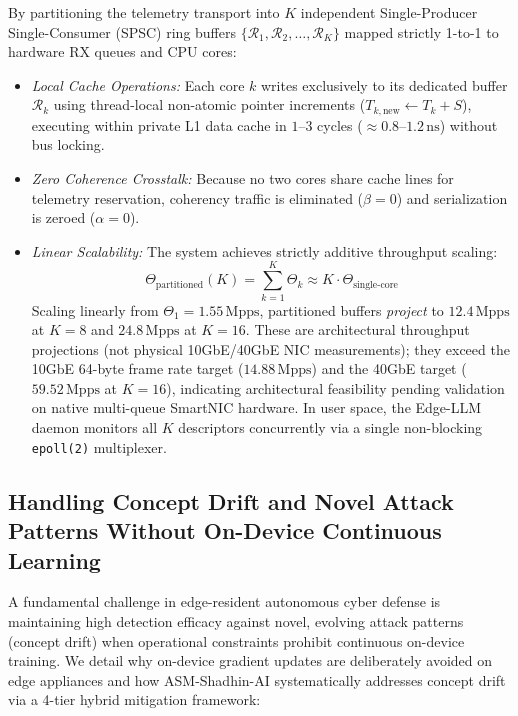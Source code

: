 \documentclass{ieeeaccess}
\renewcommand{\_}{\textunderscore\allowbreak}
\begin{document}
\begin{enumerate}
  By partitioning the telemetry transport into $K$ independent Single-Producer Single-Consumer (SPSC) ring buffers $\{\mathcal{R}_1, \mathcal{R}_2, \dots, \mathcal{R}_K\}$ mapped strictly 1-to-1 to hardware RX queues and CPU cores:
  \begin{itemize}
    \item \textit{Local Cache Operations:} Each core $k$ writes exclusively to its dedicated buffer $\mathcal{R}_k$ using thread-local non-atomic pointer increments ($T_{k,\text{new}} \leftarrow T_k + S$), executing within private L1 data cache in $1$--$3$ cycles (${\approx}0.8$--$1.2\,\text{ns}$) without bus locking.
    \item \textit{Zero Coherence Crosstalk:} Because no two cores share cache lines for telemetry reservation, coherency traffic is eliminated ($\beta = 0$) and serialization is zeroed ($\alpha = 0$).
    \item \textit{Linear Scalability:} The system achieves strictly additive throughput scaling:
    \begin{equation}
      \Theta_{\text{partitioned}}(K) = \sum_{k=1}^K \Theta_k \approx K \cdot \Theta_{\text{single-core}}
      \label{eq:partitioned_scaling}
    \end{equation}
    Scaling linearly from $\Theta_1 = 1.55\,\text{Mpps}$, partitioned buffers \textit{project} to
    $12.4\,\text{Mpps}$ at $K=8$ and $24.8\,\text{Mpps}$ at $K=16$. These are architectural
    throughput projections (not physical 10GbE/40GbE NIC measurements); they exceed the
    10GbE 64-byte frame rate target ($14.88\,\text{Mpps}$) and the 40GbE target
    ($59.52\,\text{Mpps}$ at $K=16$), indicating architectural feasibility pending
    validation on native multi-queue SmartNIC hardware.
    In user space, the Edge-LLM daemon monitors all $K$ descriptors concurrently via a
    single non-blocking \texttt{epoll(2)} multiplexer.
  \end{itemize}
\end{enumerate}

\subsection{Handling Concept Drift and Novel Attack Patterns Without On-Device Continuous Learning}
A fundamental challenge in edge-resident autonomous cyber defense is maintaining high detection efficacy against novel, evolving attack patterns (concept drift) when operational constraints prohibit continuous on-device training. We detail why on-device gradient updates are deliberately avoided on edge appliances and how ASM-Shadhin-AI systematically addresses concept drift via a 4-tier hybrid mitigation framework:
\end{document}
